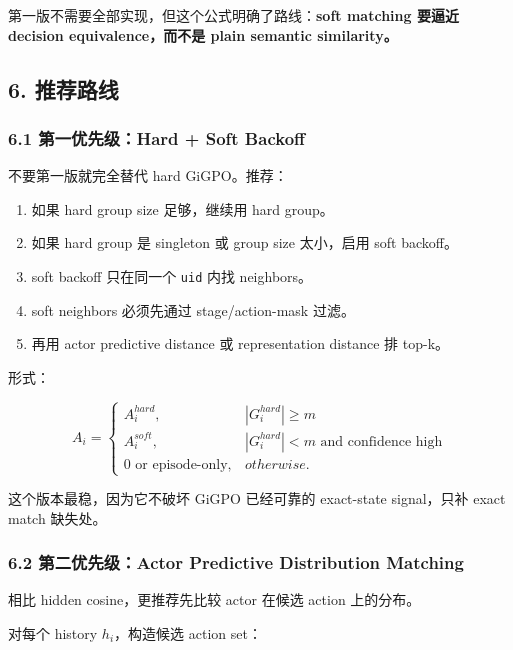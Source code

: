 \documentclass[
  10pt,
]{ctexart}
\providecommand{\tightlist}{%
  \setlength{\itemsep}{0pt}\setlength{\parskip}{0pt}}
\begin{document}
第一版不需要全部实现，但这个公式明确了路线：\textbf{soft matching 要逼近
decision equivalence，而不是 plain semantic similarity。}

\subsection{6. 推荐路线}\label{ux63a8ux8350ux8defux7ebf}

\subsubsection{6.1 第一优先级：Hard + Soft
Backoff}\label{ux7b2cux4e00ux4f18ux5148ux7ea7hard-soft-backoff}

不要第一版就完全替代 hard GiGPO。推荐：

\begin{enumerate}
\def\labelenumi{\arabic{enumi}.}
\tightlist
\item
  如果 hard group size 足够，继续用 hard group。
\item
  如果 hard group 是 singleton 或 group size 太小，启用 soft backoff。
\item
  soft backoff 只在同一个 \texttt{uid} 内找 neighbors。
\item
  soft neighbors 必须先通过 stage/action-mask 过滤。
\item
  再用 actor predictive distance 或 representation distance 排 top-k。
\end{enumerate}

形式：

\[
A_i =
\begin{cases}
A_i^{hard}, & |G_i^{hard}|\ge m \\
A_i^{soft}, & |G_i^{hard}|<m \text{ and confidence high}\\
0 \text{ or episode-only}, & otherwise.
\end{cases}
\]

这个版本最稳，因为它不破坏 GiGPO 已经可靠的 exact-state signal，只补
exact match 缺失处。

\subsubsection{6.2 第二优先级：Actor Predictive Distribution
Matching}\label{ux7b2cux4e8cux4f18ux5148ux7ea7actor-predictive-distribution-matching}

相比 hidden cosine，更推荐先比较 actor 在候选 action 上的分布。

对每个 history \(h_i\)，构造候选 action set：
\end{document}
